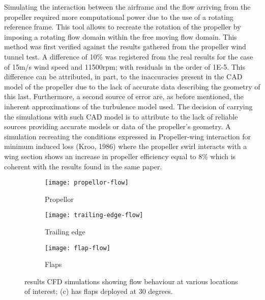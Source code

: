 \documentclass[../../main.tex]{subfiles}
\begin{document}
Simulating the interaction between the airframe and the flow arriving from the propeller required more computational power due to the use of a rotating reference frame.
This tool allows to recreate the rotation of the propeller by imposing a rotating flow domain within the free moving flow domain.
This method was first verified against the results gathered from the propeller wind tunnel test.
A difference of 10\% was registered from the real results for the case of 15m/s wind speed and 11500rpm; with residuals in the order of 1E-5.
This difference can be attributed, in part, to the inaccuracies present in the CAD model of the propeller due to the lack of accurate data describing the geometry of this last.
Furthermore, a second source of error are, as before mentioned, the inherent approximations of the turbulence model used.
The decision of carrying the simulations with such CAD model is to attribute to the lack of reliable sources providing accurate models or data of the propeller’s geometry.
A simulation recreating the conditions expressed in Propeller-wing interaction for minimum induced loss (Kroo, 1986) where the propeller swirl interacts with a wing section shows an increase in propeller efficiency equal to 8\% which is coherent with the results found in the same paper.


\begin{figure}[H]

    \centering
    \begin{subfigure}[b]{0.49\columnwidth}
        \centering
        \texttt{[image: propellor-flow]}
        \caption{Propellor}
        \label{fig:flow-behaviour:propellor}
    \end{subfigure}
    \hfill
    \begin{subfigure}[b]{0.49\columnwidth}
        \centering
        \texttt{[image: trailing-edge-flow]}
        \caption{Trailing edge}
        \label{fig:flow-behaviour:trailing-edge}
    \end{subfigure}

    \begin{subfigure}[b]{0.49\columnwidth}
        \centering
        \texttt{[image: flap-flow]}
        \caption{Flaps}
        \label{fig:flow-behaviour:flaps}
    \end{subfigure}
    
    \caption{results CFD simulations showing flow behaviour at various locations of interest; (c) has flaps deployed at 30 degrees.}
    \label{fig:flow-behaviour}
\end{figure} 
\end{document}
